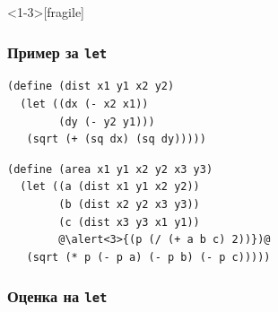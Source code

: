 \documentclass{beamer}
\begin{document}
\begin{frame}<1-3>[fragile]
  \frametitle{Пример за \tt{let}}

\begin{lstlisting}
(define (dist x1 y1 x2 y2)
  (let ((dx (- x2 x1))
        (dy (- y2 y1)))
   (sqrt (+ (sq dx) (sq dy)))))
\end{lstlisting}
\pause
\begin{lstlisting}
(define (area x1 y1 x2 y2 x3 y3)
  (let ((a (dist x1 y1 x2 y2))
        (b (dist x2 y2 x3 y3))
        (c (dist x3 y3 x1 y1))
        @\alert<3>{(p (/ (+ a b c) 2))})@
   (sqrt (* p (- p a) (- p b) (- p c)))))
\end{lstlisting}
\end{frame}

\begin{frame}
  \frametitle{Оценка на \tt{let}}


\end{frame}
\end{document}
